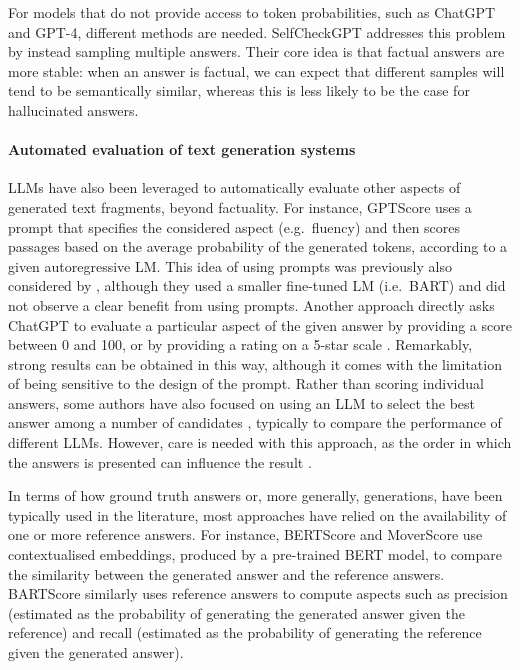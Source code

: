 \documentclass[11pt]{article}
\begin{document}
For models that do not provide access to token probabilities, such as ChatGPT and GPT-4, different methods are needed. SelfCheckGPT \cite{DBLP:journals/corr/abs-2303-08896} addresses this problem by instead sampling multiple answers. Their core idea is that factual answers are more stable: when an answer is factual, we can expect that different samples will tend to be semantically similar, whereas this is less likely to be the case for hallucinated answers.

\paragraph{Automated evaluation of text generation systems}
LLMs have also been leveraged to automatically evaluate other aspects of generated text fragments, beyond factuality. For instance, GPTScore \cite{DBLP:journals/corr/abs-2302-04166} uses a prompt that specifies the considered aspect (e.g.\ fluency) and then scores passages based on the average probability of the generated tokens, according to a given autoregressive LM. This idea of using prompts was previously also considered by \citet{DBLP:conf/nips/YuanNL21}, although they used a smaller fine-tuned LM (i.e.\ BART) and did not observe a clear benefit from using prompts. Another approach directly asks ChatGPT to evaluate a particular aspect of the given answer by providing a score between 0 and 100, or by providing a rating on a 5-star scale \cite{DBLP:journals/corr/abs-2303-04048}. Remarkably, strong results can be obtained in this way, although it comes with the limitation of being sensitive to the design of the prompt. Rather than scoring individual answers, some authors have also focused on using an LLM to select the best answer among a number of candidates \cite{DBLP:journals/corr/abs-2305-17926}, typically to compare the performance of different LLMs. However, care is needed with this approach, as the order in which the answers is presented can influence the result \cite{DBLP:journals/corr/abs-2305-17926}. 

In terms of how ground truth answers or, more generally, generations, have been typically used in the literature, most approaches have relied on the availability of one or more reference answers. For instance, BERTScore \cite{DBLP:conf/iclr/ZhangKWWA20} and MoverScore \cite{zhao-etal-2019-moverscore} use contextualised embeddings, produced by a pre-trained BERT model, to compare the similarity between the generated answer and the reference answers. BARTScore \cite{DBLP:conf/nips/YuanNL21} similarly uses reference answers to compute aspects such as precision (estimated as the probability of generating the generated answer given the reference) and recall (estimated as the probability of generating the reference given the generated answer).
\end{document}
